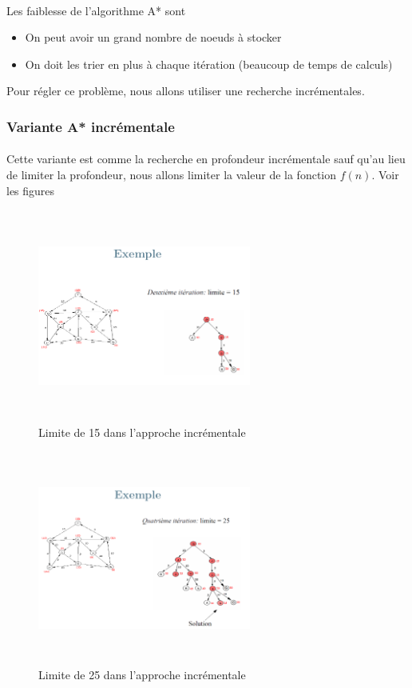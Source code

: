 \documentclass[oneside]{book}
\begin{document}
\paragraph{}
Les faiblesse de l'algorithme A* sont 
\begin{itemize}
\item On peut avoir un grand nombre de noeuds à stocker
\item On doit les trier en plus à chaque itération (beaucoup de temps de calculs)
\end{itemize}
Pour régler ce problème, nous allons utiliser une recherche incrémentales.
\subsubsection{Variante A* incrémentale}
\paragraph{}
Cette variante est comme la recherche en profondeur incrémentale sauf qu'au lieu de limiter la profondeur, nous allons limiter la valeur de la fonction $f(n)$. Voir les figures 

\begin{figure}[!ht]
\centering
\includegraphics[width = 7cm, height = 7cm, keepaspectratio]{incrementale_15.png}
\caption{Limite de 15 dans l'approche incrémentale}
\label{fig:incrementale15}
\end{figure}

\begin{figure}[!ht]
\centering
\includegraphics[width = 7cm, height = 7cm, keepaspectratio]{incrementale_25.png}
\caption{Limite de 25 dans l'approche incrémentale}
\label{fig:incrementale25}
\end{figure}
\end{document}
